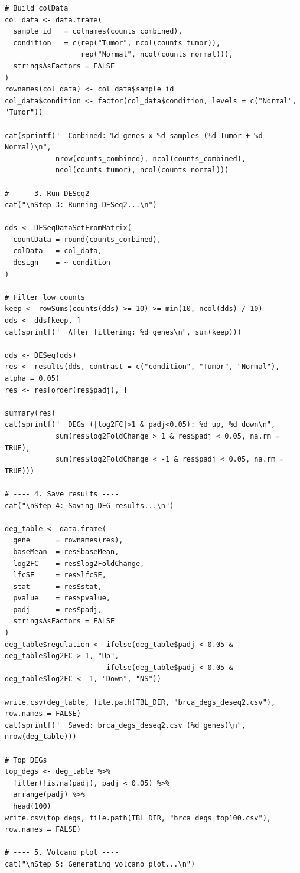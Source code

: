 \documentclass[12pt,a4paper]{ctexart}
\begin{document}
\begin{lstlisting}[caption={04_diff_expression}, basicstyle=\ttfamily\scriptsize]
# Build colData
col_data <- data.frame(
  sample_id   = colnames(counts_combined),
  condition   = c(rep("Tumor", ncol(counts_tumor)),
                  rep("Normal", ncol(counts_normal))),
  stringsAsFactors = FALSE
)
rownames(col_data) <- col_data$sample_id
col_data$condition <- factor(col_data$condition, levels = c("Normal", "Tumor"))

cat(sprintf("  Combined: %d genes x %d samples (%d Tumor + %d Normal)\n",
            nrow(counts_combined), ncol(counts_combined),
            ncol(counts_tumor), ncol(counts_normal)))

# ---- 3. Run DESeq2 ----
cat("\nStep 3: Running DESeq2...\n")

dds <- DESeqDataSetFromMatrix(
  countData = round(counts_combined),
  colData   = col_data,
  design    = ~ condition
)

# Filter low counts
keep <- rowSums(counts(dds) >= 10) >= min(10, ncol(dds) / 10)
dds <- dds[keep, ]
cat(sprintf("  After filtering: %d genes\n", sum(keep)))

dds <- DESeq(dds)
res <- results(dds, contrast = c("condition", "Tumor", "Normal"), alpha = 0.05)
res <- res[order(res$padj), ]

summary(res)
cat(sprintf("  DEGs (|log2FC|>1 & padj<0.05): %d up, %d down\n",
            sum(res$log2FoldChange > 1 & res$padj < 0.05, na.rm = TRUE),
            sum(res$log2FoldChange < -1 & res$padj < 0.05, na.rm = TRUE)))

# ---- 4. Save results ----
cat("\nStep 4: Saving DEG results...\n")

deg_table <- data.frame(
  gene      = rownames(res),
  baseMean  = res$baseMean,
  log2FC    = res$log2FoldChange,
  lfcSE     = res$lfcSE,
  stat      = res$stat,
  pvalue    = res$pvalue,
  padj      = res$padj,
  stringsAsFactors = FALSE
)
deg_table$regulation <- ifelse(deg_table$padj < 0.05 & deg_table$log2FC > 1, "Up",
                        ifelse(deg_table$padj < 0.05 & deg_table$log2FC < -1, "Down", "NS"))

write.csv(deg_table, file.path(TBL_DIR, "brca_degs_deseq2.csv"), row.names = FALSE)
cat(sprintf("  Saved: brca_degs_deseq2.csv (%d genes)\n", nrow(deg_table)))

# Top DEGs
top_degs <- deg_table %>%
  filter(!is.na(padj), padj < 0.05) %>%
  arrange(padj) %>%
  head(100)
write.csv(top_degs, file.path(TBL_DIR, "brca_degs_top100.csv"), row.names = FALSE)

# ---- 5. Volcano plot ----
cat("\nStep 5: Generating volcano plot...\n")


\end{lstlisting}
\end{document}
